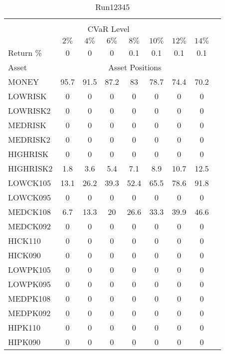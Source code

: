 \begin{table}[h!t]
\caption{Run12345}
\centering
\begin{tabular}[t]{ l c c c c c c c c }
\hline\hline \\
\multicolumn{8}{c}{CVaR Level} \\
 & $2\%$ & $4\%$ & $6\%$ & $8\%$ & $10\%$ & $12\%$ & $14\%$ \\[0.5ex]
Return \% &0 &0 &0 &0.1 &0.1 &0.1 &0.1\\[0.5ex]
Asset & \multicolumn{7}{c}{Asset Positions} \\[1ex]
MONEY & 95.7 & 91.5 & 87.2 & 83 & 78.7 & 74.4 & 70.2\\
LOWRISK & 0 & 0 & 0 & 0 & 0 & 0 & 0\\
LOWRISK2 & 0 & 0 & 0 & 0 & 0 & 0 & 0\\
MEDRISK & 0 & 0 & 0 & 0 & 0 & 0 & 0\\
MEDRISK2 & 0 & 0 & 0 & 0 & 0 & 0 & 0\\
HIGHRISK & 0 & 0 & 0 & 0 & 0 & 0 & 0\\
HIGHRISK2 & 1.8 & 3.6 & 5.4 & 7.1 & 8.9 & 10.7 & 12.5\\
LOWCK105 & 13.1 & 26.2 & 39.3 & 52.4 & 65.5 & 78.6 & 91.8\\
LOWCK095 & 0 & 0 & 0 & 0 & 0 & 0 & 0\\
MEDCK108 & 6.7 & 13.3 & 20 & 26.6 & 33.3 & 39.9 & 46.6\\
MEDCK092 & 0 & 0 & 0 & 0 & 0 & 0 & 0\\
HICK110 & 0 & 0 & 0 & 0 & 0 & 0 & 0\\
HICK090 & 0 & 0 & 0 & 0 & 0 & 0 & 0\\
LOWPK105 & 0 & 0 & 0 & 0 & 0 & 0 & 0\\
LOWPK095 & 0 & 0 & 0 & 0 & 0 & 0 & 0\\
MEDPK108 & 0 & 0 & 0 & 0 & 0 & 0 & 0\\
MEDPK092 & 0 & 0 & 0 & 0 & 0 & 0 & 0\\
HIPK110 & 0 & 0 & 0 & 0 & 0 & 0 & 0\\
HIPK090 & 0 & 0 & 0 & 0 & 0 & 0 & 0\\
[1ex] \hline
\end{tabular}
\end{table} 